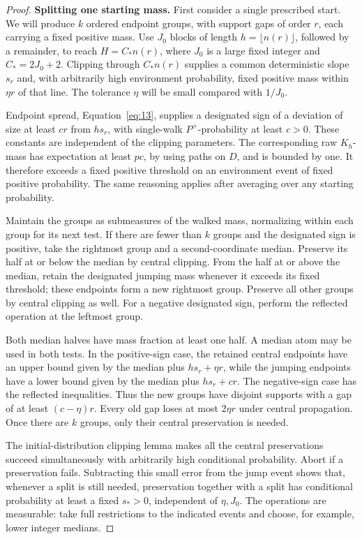 \begin{proof}
\smallskip\noindent\textbf{Splitting one starting mass.}
First consider a single prescribed start. We will produce \(k\) ordered
endpoint groups, with support gaps of order \(r\), each carrying a
fixed positive mass. Use \(J_0\) blocks of length
\(h=\lfloor n(r)\rfloor\), followed by a remainder, to reach
\(H=C_*n(r)\), where \(J_0\) is a large fixed integer and
\(C_*=2J_0+2\). Clipping through \(C_*n(r)\) supplies a common
deterministic slope \(s_r\) and, with arbitrarily high environment
probability, fixed positive mass within \(\eta r\) of that line.
The tolerance \(\eta\) will be small compared with \(1/J_0\).

Endpoint spread, Equation~\eqref{eq:13}, supplies a designated sign
of a deviation of size at least \(cr\) from \(hs_r\), with
single-walk \(P^+\)-probability at least \(c>0\). These constants
are independent of the clipping parameters. The corresponding raw
\(K_h\)-mass has expectation at least \(pc\), by using paths on
\(D\), and is bounded by one. It therefore exceeds a fixed positive
threshold on an environment event of fixed positive probability. The
same reasoning applies after averaging over any starting probability.

Maintain the groups as submeasures of the walked mass, normalizing
within each group for its next test. If there are fewer than \(k\)
groups and the designated sign is positive, take the rightmost group
and a second-coordinate median. Preserve its half at or below the
median by central clipping. From the half at or above the median,
retain the designated jumping mass whenever it exceeds its fixed
threshold; these endpoints form a new rightmost group. Preserve all
other groups by central clipping as well. For a negative designated
sign, perform the reflected operation at the leftmost group.

Both median halves have mass fraction at least one half. A median atom
may be used in both tests. In the positive-sign case, the retained
central endpoints have an upper bound given by the median plus \(hs_r+\eta r\), while the jumping
endpoints have a lower bound given by the median plus \(hs_r+cr\).
The negative-sign case has the reflected inequalities. Thus the new groups have disjoint supports with a gap of at least
\((c-\eta)r\). Every old gap loses at most \(2\eta r\) under
central propagation. Once there are \(k\) groups, only their central
preservation is needed.

The initial-distribution clipping lemma makes all the central
preservations succeed simultaneously with arbitrarily high conditional
probability. Abort if a preservation fails. Subtracting this small
error from the jump event shows that, whenever a split is still needed,
preservation together with a split has conditional probability at least
a fixed \(s_*>0\), independent of \(\eta,J_0\). The operations are
measurable: take full restrictions to the indicated events and choose,
for example, lower integer medians.


\end{proof}

